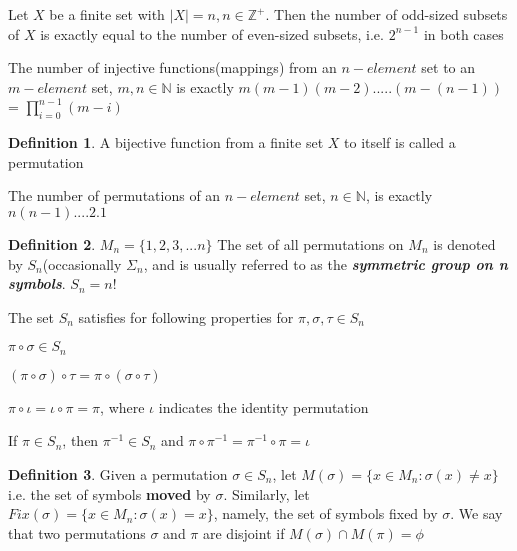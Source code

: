 \documentclass{article}
\theoremstyle{definition}
\newtheorem*{defi}{Definition}
\theoremstyle{definition}
\newenvironment{manualprop}[1]{%
  \renewcommand\themanualpropinner{#1}%
  \manualpropinner
}{\endmanualpropinner}
\newenvironment{manualcoro}[1]{%
  \renewcommand\themanualcoroinner{#1}%
  \manualcoroinner
}{\endmanualcoroinner}
\theoremstyle{named}
\begin{document}
\begin{manualcoro}{14.2}
Let $X$ be a finite set with $|X| = n, n \in \mathbb{Z^{+}}$. Then the number of odd-sized subsets of $X$ is exactly equal to the number of even-sized subsets, i.e. $2^{n-1}$ in both cases
\end{manualcoro}

\begin{manualprop}{15}
The number of injective functions(mappings) from an $n-element$ set to an $m-element$ set, $m, n \in \mathbb{N}$ is exactly $m(m-1)(m-2).....(m-(n-1))$ = $\prod_{i = 0}^{n-1} (m-i)$
\end{manualprop}

\begin{defi}
A bijective function from a finite set $X$ to itself is called a permutation
\end{defi}

\begin{manualprop}{16}
The number of permutations of an $n-element$ set, $n \in \mathbb{N}$, is exactly $n(n-1)....2.1$
\end{manualprop}

\begin{defi}
$M_n = \{1, 2, 3, ...n\}$
The set of all permutations on $M_n$ is denoted by $S_n$(occasionally $\Sigma_n$, and is usually referred to as the \textbf{\textit{symmetric group on n symbols}}. $S_n = n!$
\end{defi}

\begin{manualprop}{17}
The set $S_n$ satisfies for following properties for $\pi, \sigma, \tau \in S_n$
\begin{citemize}
    \item $\pi \circ \sigma \in S_n$
    \item $(\pi \circ \sigma) \circ \tau = \pi \circ (\sigma \circ \tau)$
    \item $\pi \circ \iota = \iota \circ \pi = \pi$, where $\iota$ indicates the identity permutation 
    \item If $\pi \in S_n$, then $\pi^{-1} \in S_n$ and $\pi \circ \pi^{-1} = \pi^{-1} \circ \pi = \iota$
\end{citemize}
\end{manualprop}

\begin{defi}
Given a permutation $\sigma \in S_n$, let $M(\sigma) = \{x \in M_n: \sigma(x) \neq x\}$ i.e. the set of symbols \textbf{moved} by $\sigma$.
Similarly, let $Fix(\sigma) = \{x \in M_n: \sigma(x) = x\}$, namely, the set of symbols fixed by $\sigma$. We say that two permutations $\sigma$ and $\pi$ are disjoint if $M(\sigma) \cap M(\pi) = \phi$ 
\end{defi}
\end{document}
